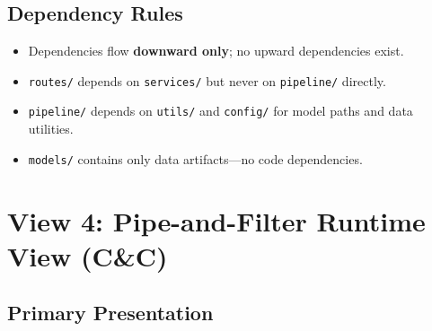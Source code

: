 \documentclass[11pt,a4paper,oneside]{report}
\newcommand{\code}[1]{\texttt{\footnotesize #1}}
\begin{document}
\subsection{Dependency Rules}
\begin{itemize}
  \item Dependencies flow \textbf{downward only}; no upward dependencies exist.
  \item \code{routes/} depends on \code{services/} but never on \code{pipeline/} directly.
  \item \code{pipeline/} depends on \code{utils/} and \code{config/} for model paths and data utilities.
  \item \code{models/} contains only data artifacts---no code dependencies.
\end{itemize}


\newpage
\section{View 4: Pipe-and-Filter Runtime View (C\&C)}

\subsection{Primary Presentation}
\end{document}
